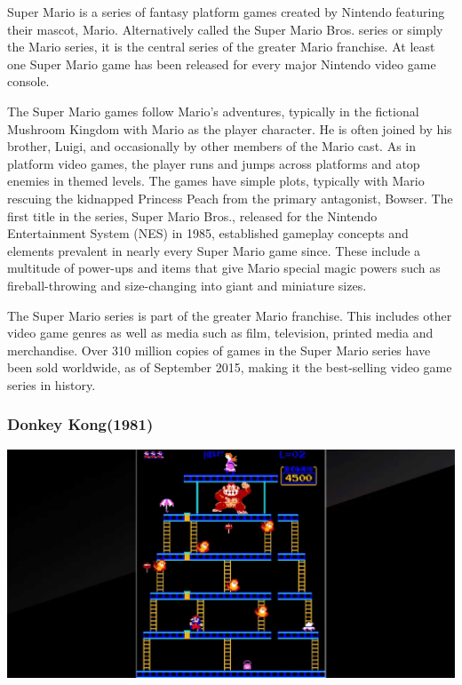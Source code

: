 \documentclass{article}
\begin{document}
Super Mario is a series of fantasy platform games created by Nintendo featuring their mascot, Mario. Alternatively called the Super Mario Bros. series or simply the Mario series, it is the central series of the greater Mario franchise. At least one Super Mario game has been released for every major Nintendo video game console.

The Super Mario games follow Mario's adventures, typically in the fictional Mushroom Kingdom with Mario as the player character. He is often joined by his brother, Luigi, and occasionally by other members of the Mario cast. As in platform video games, the player runs and jumps across platforms and atop enemies in themed levels. The games have simple plots, typically with Mario rescuing the kidnapped Princess Peach from the primary antagonist, Bowser. The first title in the series, Super Mario Bros., released for the Nintendo Entertainment System (NES) in 1985, established gameplay concepts and elements prevalent in nearly every Super Mario game since. These include a multitude of power-ups and items that give Mario special magic powers such as fireball-throwing and size-changing into giant and miniature sizes.

The Super Mario series is part of the greater Mario franchise. This includes other video game genres as well as media such as film, television, printed media and merchandise. Over 310 million copies of games in the Super Mario series have been sold worldwide, as of September 2015, making it the best-selling video game series in history.

\clearpage

\subsubsection{Donkey Kong(1981)}
\includegraphics [scale=0.12]{donkeykong}
\clearpage
			
\end{document}
